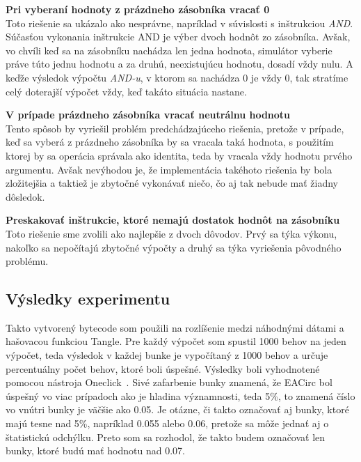 \begin{myItemize}
 \item \textbf{Pri vyberaní hodnoty z prázdneho zásobníka vracať 0}\\Toto riešenie sa ukázalo ako nesprávne, napríklad v súvislosti s inštrukciou \textit{AND}. Súčasťou vykonania inštrukcie AND je výber dvoch hodnôt zo zásobníka. Avšak, vo chvíli keď sa na zásobníku nachádza len jedna hodnota, simulátor vyberie práve túto jednu hodnotu a za druhú, neexistujúcu hodnotu, dosadí vždy nulu. A keďže výsledok výpočtu \textit{AND-u}, v ktorom sa nachádza 0 je vždy 0, tak stratíme celý doterajší výpočet vždy, keď takáto situácia nastane.
 \item \textbf{V prípade prázdneho zásobníka vracať neutrálnu hodnotu}\\Tento spôsob by vyriešil problém predchádzajúceho riešenia, pretože v prípade, keď sa vyberá z prázdneho zásobníka by sa vracala taká hodnota, s použitím ktorej by sa operácia správala ako identita, teda by vracala vždy hodnotu prvého argumentu. Avšak nevýhodou je, že implementácia takéhoto riešenia by bola zložitejšia a taktiež je zbytočné vykonávať niečo, čo aj tak nebude mať žiadny dôsledok. 
 \item \textbf{Preskakovať inštrukcie, ktoré nemajú dostatok hodnôt na zásobníku}\\Toto riešenie sme zvolili ako najlepšie z dvoch dôvodov. Prvý sa týka výkonu, nakoľko sa nepočítajú zbytočné výpočty a druhý sa týka vyriešenia pôvodného problému. 
\end{myItemize}

\subsection{Výsledky experimentu}
\label{subsec:exp1-results}

Takto vytvorený bytecode som použili na rozlíšenie medzi náhodnými dátami a hašovacou funkciou Tangle. Pre každý výpočet som spustil 1000 behov na jeden výpočet, teda výsledok v každej bunke je vypočítaný z 1000 behov a určuje percentuálny počet behov, ktoré boli úspešné. Výsledky boli vyhodnotené pomocou nástroja Oneclick~\cite{obratil-bc}. Sivé zafarbenie bunky znamená, že EACirc bol úspešný vo viac prípadoch ako je hladina významnosti, teda 5\%, to znamená číslo vo vnútri bunky je väčšie ako 0.05. Je otázne, či takto označovať aj bunky, ktoré majú tesne nad 5\%, napríklad 0.055 alebo 0.06, pretože sa môže jednať aj o štatistickú odchýlku. Preto som sa rozhodol, že takto budem označovať len bunky, ktoré budú mať hodnotu nad 0.07.
 
